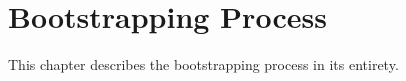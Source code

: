 \chapter{Bootstrapping Process}
\label{process}

This chapter describes the bootstrapping process in its entirety.
